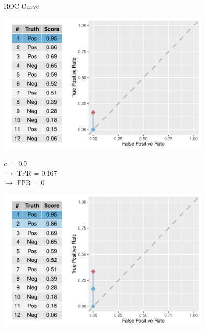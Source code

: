 \documentclass[11pt,compress,t,notes=noshow, xcolor=table]{beamer}
\newenvironment{knitrout}{}{} %
\begin{document}
\begin{vbframe}{ROC Curve}

\begin{knitrout}\scriptsize
{}\color{fgcolor}

{\centering \includegraphics[width=0.8\textwidth]{figure/eval_mclass_roc_sp_5}

}



\end{knitrout}

$c =$ 0.9\\
$\rightarrow$ TPR = 0.167 \\
$\rightarrow$ FPR = 0


\framebreak

\begin{knitrout}\scriptsize
{}\color{fgcolor}

{\centering \includegraphics[width=0.8\textwidth]{figure/eval_mclass_roc_sp_6}

}



\end{knitrout}


\end{vbframe}
\end{document}
